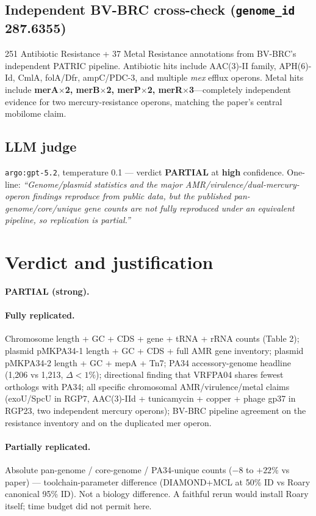\documentclass[11pt]{article}
\begin{document}
\subsection{Independent BV-BRC cross-check (\texttt{genome\_id} 287.6355)}
251 Antibiotic Resistance + 37 Metal Resistance annotations from BV-BRC's independent PATRIC
pipeline. Antibiotic hits include AAC(3)-II family, APH(6)-Id, CmlA, folA/Dfr, ampC/PDC-3, and
multiple \textit{mex} efflux operons. Metal hits include \textbf{merA$\times$2, merB$\times$2,
merP$\times$2, merR$\times$3}---completely independent evidence for two mercury-resistance operons,
matching the paper's central mobilome claim.

\subsection{LLM judge}
\texttt{argo:gpt-5.2}, temperature 0.1 --- verdict \textbf{PARTIAL} at \textbf{high} confidence.
One-line: \textit{``Genome/plasmid statistics and the major AMR/virulence/dual-mercury-operon
findings reproduce from public data, but the published pan-genome/core/unique gene counts are not
fully reproduced under an equivalent pipeline, so replication is partial.''}

\section{Verdict and justification}
\textbf{PARTIAL (strong).}

\paragraph{Fully replicated.} Chromosome length + GC + CDS + gene + tRNA + rRNA counts (Table 2);
plasmid pMKPA34-1 length + GC + CDS + full AMR gene inventory; plasmid pMKPA34-2 length + GC +
mepA + Tn7; PA34 accessory-genome headline (1{,}206 vs 1{,}213, $\Delta<1\%$); directional
finding that VRFPA04 shares fewest orthologs with PA34; all specific chromosomal AMR/virulence/metal
claims (exoU/SpcU in RGP7, AAC(3)-IId + tunicamycin + copper + phage gp37 in RGP23, two
independent mercury operons); BV-BRC pipeline agreement on the resistance inventory and on the
duplicated mer operon.

\paragraph{Partially replicated.} Absolute pan-genome / core-genome / PA34-unique counts
($-8$ to $+22\%$ vs paper) --- toolchain-parameter difference (DIAMOND+MCL at 50\% ID vs Roary
canonical 95\% ID). Not a biology difference. A faithful rerun would install Roary itself; time
budget did not permit here.
\end{document}
